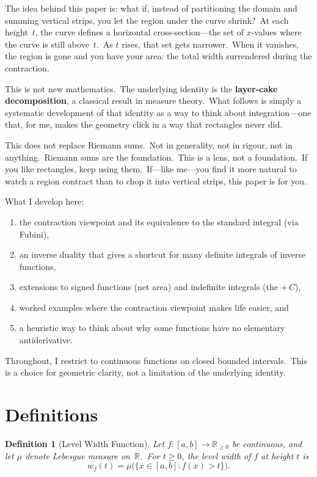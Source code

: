 \documentclass[11pt,a4paper]{article}
\newtheorem{definition}[theorem]{Definition}
\begin{document}
The idea behind this paper is: what if, instead of partitioning the domain and summing
vertical strips, you let the region under the curve shrink?\ At each height~$t$, the curve defines a
horizontal cross-section---the set of $x$-values where the curve is still above~$t$.\ As $t$ rises, that set
gets narrower.\ When it vanishes, the region is gone and you have your area: the total width
surrendered during the contraction.

This is not new mathematics.\ The underlying identity is the \textbf{layer-cake decomposition},
a classical result in measure theory.\ What follows is simply a systematic development of that
identity as a way to think about integration---one that, for me, makes the geometry click in a
way that rectangles never did.

This does not replace Riemann sums.\ Not in generality, not in rigour, not in anything.\
Riemann sums are the foundation.\ This is a lens, not a foundation.\ If you like rectangles, keep
using them.\ If---like me---you find it more natural to watch a region contract than to chop it
into vertical strips, this paper is for you.

What I develop here:
\begin{enumerate}[label=(\roman*)]
\item the contraction viewpoint and its equivalence to the standard integral (via Fubini),
\item an inverse duality that gives a shortcut for many definite integrals of inverse functions,
\item extensions to signed functions (net area) and indefinite integrals (the $+\,C$),
\item worked examples where the contraction viewpoint makes life easier, and
\item a heuristic way to think about why some functions have no elementary antiderivative.
\end{enumerate}

Throughout, I restrict to continuous functions on closed bounded intervals.\ This is a choice
for geometric clarity, not a limitation of the underlying identity.

\section{Definitions}

\begin{definition}[Level Width Function]\label{def:level-width}
Let $f:[a,b]\to\mathbb{R}_{\geq 0}$ be continuous, and let $\mu$ denote
Lebesgue measure on~$\mathbb{R}$.\ For $t\geq 0$, the \emph{level width} of $f$ at height $t$ is
\[
w_f(t) = \mu\bigl(\{x\in[a,b] : f(x)>t\}\bigr).
\]
\end{definition}
\end{document}
